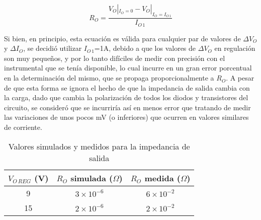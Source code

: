 \documentclass[e2_tp1_main.tex]{subfiles}
\begin{document}
\begin{equation}
	R_O = \frac{V_O|_{I_O=0} - V_O|_{I_O=I_{O\,1}}}{I_{O\,1}}
\end{equation} 

Si bien, en principio, esta ecuaci\'on es v\'alida para cualquier par de valores de $\Delta V_O$ y $\Delta I_O$, se decidi\'o utilizar $I_{O\,1}$=1A, debido a que los valores de $\Delta V_O$ en regulaci\'on son muy peque\~nos, y por lo tanto dif\'iciles de medir con precisi\'on con el instrumental que se ten\'ia disponible, lo cual incurre en un gran error porcentual en la determinaci\'on del mismo, que se propaga proporcionalmente a $R_O$. A pesar de que esta forma se ignora el hecho de que la impedancia de salida cambia con la carga, dado que cambia la polarizaci\'on de todos los diodos y transistores del circuito, se consider\'o que se incurrir\'ia as\'i en menos error que tratando de medir las variaciones de unos pocos mV (o inferiores) que ocurren en valores similares de corriente.

\begin{table}[!htb]
\centering
\begin{tabular}{|c|c|c|}
\hline
$V_{O\,REG}$ (V) & $R_O$ simulada ($\Omega$) & $R_O$ medida ($\Omega$) \\ \hline\hline
9                & $3 \times 10^{-6}$        & $6 \times 10^{-2}$      \\ \hline
15               & $2 \times 10^{-6}$        & $2 \times 10^{-2}$      \\ \hline
\end{tabular}
\caption{Valores simulados y medidos para la impedancia de salida}
\label{table:rout}
\end{table}
\end{document}

